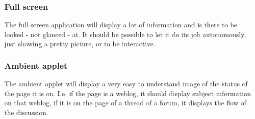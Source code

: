 \subsubsection{Full screen}

The full screen application will display a lot of information and is there to
be looked - not glanced - at. It should be possible to let it do its job
autonomously, just showing a pretty picture, or to be interactive.

\subsubsection{Ambient applet}

The ambient applet will display a very easy to understand image of the status
of the page it is on. I.e. if the page is a weblog, it should display subject
information on that weblog, if it is on the page of a thread of a forum, it
displays the flow of the discussion.


